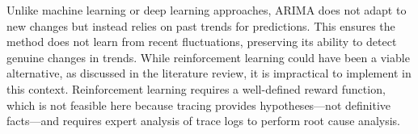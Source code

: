 \documentclass[pdflatex,sn-nature]{sn-jnl}%
\theoremstyle{thmstyleone}%
\theoremstyle{thmstyletwo}%
\theoremstyle{thmstylethree}%
\begin{document}
Unlike machine learning or deep learning approaches, ARIMA does not adapt to new changes but instead relies on past trends for predictions. This ensures the method does not learn from recent fluctuations, preserving its ability to detect genuine changes in trends. While reinforcement learning could have been a viable alternative, as discussed in the literature review, it is impractical to implement in this context. Reinforcement learning requires a well-defined reward function, which is not feasible here because tracing provides hypotheses—not definitive facts—and requires expert analysis of trace logs to perform root cause analysis.


\end{document}
